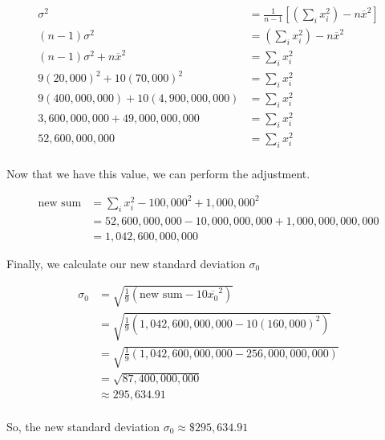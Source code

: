 \documentclass[12pt,letterpaper]{article}
\begin{document}
\begin{enumerate}
\begin{enumerate}
\begin{enumerate}[label=\arabic* )]
              \begin{align*}
                \sigma^2 &= \frac{1}{n - 1} \left[\left(\sum_{i} x_i^2\right) - n \overline{x}^2\right] \\
                (n - 1) \sigma^2 &= \left(\sum_{i} x_i^2\right) - n \overline{x}^2 \\
                (n - 1) \sigma^2 + n \overline{x}^2 &= \sum_{i} x_i^2 \\
                9 (20,000)^2 + 10 (70,000)^2 &= \sum_{i} x_i^2 \\
                9 (400,000,000) + 10 (4,900,000,000) &= \sum_{i} x_i^2 \\
                3,600,000,000 + 49,000,000,000 &= \sum_{i} x_i^2 \\
                52,600,000,000 &= \sum_{i} x_i^2 \\
              \end{align*}

              Now that we have this value,
              we can perform the adjustment.

              \begin{align*}
                \text{new sum} &= \sum_i x_i^2 - 100,000^2 + 1,000,000^2 \\
                &= 52,600,000,000 - 10,000,000,000 + 1,000,000,000,000 \\
                &= 1,042,600,000,000
              \end{align*}

              Finally, we calculate our new standard deviation $\sigma_0$

              \begin{align*}
                \sigma_0 &= \sqrt{\frac{1}{9} \left(\text{new sum} - 10 \overline{x_0}^2\right)} \\
                &= \sqrt{\frac{1}{9} \left(1,042,600,000,000 - 10 (160,000)^2\right)} \\
                &= \sqrt{\frac{1}{9} \left(1,042,600,000,000 - 256,000,000,000 \right)} \\
                &= \sqrt{87,400,000,000} \\
                &\approx 295,634.91 \\
              \end{align*}

              So, the new standard deviation $\sigma_0 \approx \$295,634.91$

          \end{enumerate}
      \end{enumerate}
  \end{enumerate}
\end{document}
